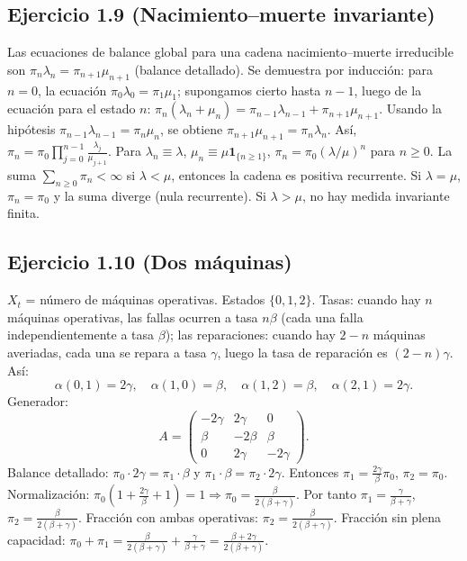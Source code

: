 \documentclass[12pt]{article}
\newcommand{\1}{\mathbf{1}}
\begin{document}
\subsection{Ejercicio 1.9 (Nacimiento--muerte invariante)}
Las ecuaciones de balance global para una cadena nacimiento--muerte irreducible son $\pi_n\lambda_n=\pi_{n+1}\mu_{n+1}$ (balance detallado). Se demuestra por inducci\'on: para $n=0$, la ecuaci\'on $\pi_0\lambda_0=\pi_1\mu_1$; supongamos cierto hasta $n-1$, luego de la ecuaci\'on para el estado $n$: $\pi_n(\lambda_n+\mu_n)=\pi_{n-1}\lambda_{n-1}+\pi_{n+1}\mu_{n+1}$. Usando la hip\'otesis $\pi_{n-1}\lambda_{n-1}=\pi_n\mu_n$, se obtiene $\pi_{n+1}\mu_{n+1}=\pi_n\lambda_n$. As\'i, $\pi_n=\pi_0\prod_{j=0}^{n-1}\frac{\lambda_j}{\mu_{j+1}}$. Para $\lambda_n\equiv\lambda$, $\mu_n\equiv\mu\1_{\{n\ge1\}}$, $\pi_n=\pi_0(\lambda/\mu)^n$ para $n\ge0$. La suma $\sum_{n\ge0}\pi_n<\infty$ si $\lambda<\mu$, entonces la cadena es positiva recurrente. Si $\lambda=\mu$, $\pi_n=\pi_0$ y la suma diverge (nula recurrente). Si $\lambda>\mu$, no hay medida invariante finita.

\subsection{Ejercicio 1.10 (Dos m\'aquinas)}
$X_t$ = n\'umero de m\'aquinas operativas. Estados $\{0,1,2\}$. Tasas: cuando hay $n$ m\'aquinas operativas, las fallas ocurren a tasa $n\beta$ (cada una falla independientemente a tasa $\beta$); las reparaciones: cuando hay $2-n$ m\'aquinas averiadas, cada una se repara a tasa $\gamma$, luego la tasa de reparaci\'on es $(2-n)\gamma$. As\'i:
\[
\alpha(0,1)=2\gamma,\quad \alpha(1,0)=\beta,\quad \alpha(1,2)=\beta,\quad \alpha(2,1)=2\gamma.
\]
Generador:
\[
A=\begin{pmatrix}
-2\gamma & 2\gamma & 0\\
\beta & -2\beta & \beta\\
0 & 2\gamma & -2\gamma
\end{pmatrix}.
\]
Balance detallado: $\pi_0\cdot2\gamma=\pi_1\cdot\beta$ y $\pi_1\cdot\beta=\pi_2\cdot2\gamma$. Entonces $\pi_1=\frac{2\gamma}{\beta}\pi_0$, $\pi_2=\pi_0$. Normalizaci\'on: $\pi_0(1+\frac{2\gamma}{\beta}+1)=1\Rightarrow\pi_0=\frac{\beta}{2(\beta+\gamma)}$. Por tanto $\pi_1=\frac{\gamma}{\beta+\gamma}$, $\pi_2=\frac{\beta}{2(\beta+\gamma)}$. Fracci\'on con ambas operativas: $\pi_2=\frac{\beta}{2(\beta+\gamma)}$. Fracci\'on sin plena capacidad: $\pi_0+\pi_1=\frac{\beta}{2(\beta+\gamma)}+\frac{\gamma}{\beta+\gamma}=\frac{\beta+2\gamma}{2(\beta+\gamma)}$.
\end{document}
